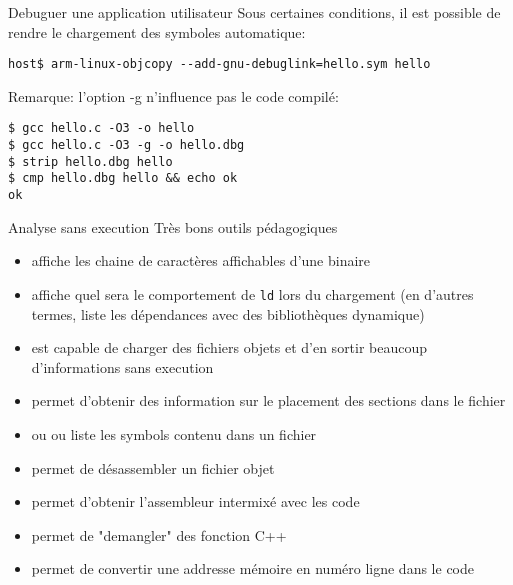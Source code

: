 \begin{frame}[fragile=singleslide]{Debuguer une application utilisateur}
  Sous certaines conditions, il est possible de rendre le chargement
  des symboles automatique:
  \begin{lstlisting}
host$ arm-linux-objcopy --add-gnu-debuglink=hello.sym hello
  \end{lstlisting}
  Remarque: l'option -g n'influence pas le code compilé:
    \begin{lstlisting}
$ gcc hello.c -O3 -o hello
$ gcc hello.c -O3 -g -o hello.dbg
$ strip hello.dbg hello
$ cmp hello.dbg hello && echo ok
ok
    \end{lstlisting}  %
\end{frame}

\begin{frame}[fragile=singleslide]{Analyse sans execution}
  Très bons outils pédagogiques
  \begin{itemize}
  \item  {} affiche  les chaine  de  caractères affichables
    d'une binaire
  \item {} affiche quel  sera le comportement de \verb+ld+ lors
    du chargement (en d'autres  termes, liste les dépendances avec des
    bibliothèques dynamique)
  \item {} est  capable de charger des fichiers  objets et d'en
    sortir beaucoup d'informations sans execution
  \item  {} permet  d'obtenir  des  information sur  le
    placement des sections dans le fichier
  \item  {} ou    ou   liste les
    symbols contenu dans un fichier
  \item {} permet de désassembler un fichier objet
  \item {}  permet d'obtenir l'assembleur intermixé avec
    les code
  \item {} permet de "demangler" des fonction C++
  \item {}  permet de convertir une  addresse mémoire en
    numéro ligne dans le code
  \end{itemize}
\end{frame}

